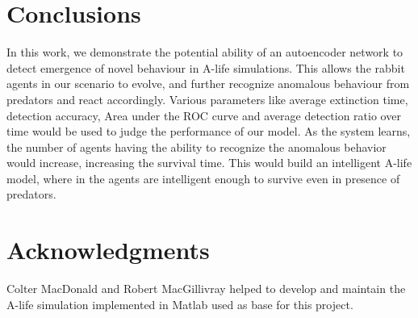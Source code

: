 \documentclass[letterpaper]{article}
\numberwithin{equation}{section}
\numberwithin{theorem}{section}
\numberwithin{lemma}{section}
\numberwithin{df}{section}
\begin{document}
\section{Conclusions}
In this work, we demonstrate the potential ability of an autoencoder network to detect emergence of novel behaviour in A-life simulations. This allows the rabbit agents in our scenario to evolve, and further recognize anomalous behaviour from predators and react accordingly. Various parameters like average extinction time, detection accuracy, Area under the ROC curve and average detection ratio over time would be used to judge the performance of our model. As the system learns, the number of agents having the ability to recognize the anomalous behavior would increase, increasing the survival time. This would build an intelligent A-life model, where in the agents are intelligent enough to survive even in presence of predators.


\section*{Acknowledgments}

Colter MacDonald and Robert MacGillivray helped to develop and maintain the A-life simulation implemented in Matlab used as base for this project. 



\end{document}
